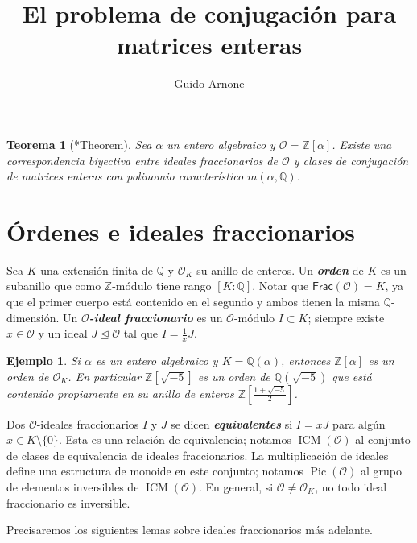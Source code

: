 \documentclass[11pt,a4paper]{amsart}
\title[El problema de conjugación para matrices enteras]{El problema
de conjugación para matrices enteras}
\author{Guido Arnone}
\date{}
\newcommand{\Q}{\mathbb{Q}}
\newcommand{\Z}{\mathbb{Z}}
\renewcommand{\emph}[1]{\textbf{\textit{#1}}}
\DeclareMathOperator{\Pic}{Pic}
\DeclareMathOperator{\ICM}{ICM}
\numberwithin{equation}{section}
\theoremstyle{plain}
\newtheorem{introthm}{Teorema}
\newtheorem{ej}[equation]{Ejemplo}
\renewcommand{\O}{\mathcal{O}}
\begin{document}
\maketitle

\begin{tcolorbox}[colback=thmcol!30, sharp corners, colframe=white]
\begin{introthm}[\cite{lm}*{Theorem}]\label{thm:main} Sea $\alpha$
un entero algebraico y $\mathcal O = \Z[\alpha]$. Existe una correspondencia
biyectiva entre ideales fraccionarios de $\mathcal O$ y clases de
conjugación de matrices enteras con polinomio característico $m(\alpha, \Q)$.
\end{introthm}
\end{tcolorbox}

\section{Órdenes e ideales fraccionarios}

Sea $K$ una extensión finita de $\Q$ y $\O_K$ su anillo de enteros. Un
\emph{orden} de $K$ es un subanillo que como $\Z$-módulo tiene
rango $[K:\Q]$. Notar que $\mathsf{Frac}(\mathcal O) = K$, ya que el primer
cuerpo está contenido en el segundo y ambos tienen la misma
$\Q$-dimensión. Un \emph{$\mathcal O$-ideal fraccionario} es
un $\mathcal O$-módulo $I \subset K$; siempre existe $x \in \mathcal O$
y un ideal $J \trianglelefteq \mathcal O$ tal que $I = \frac{1}{x} J$.
\begin{ej} Si $\alpha$ es un entero algebraico y $K=\Q(\alpha)$,
entonces $\Z[\alpha]$ es un orden de $\O_K$. En particular
$\Z[\sqrt{-5}]$ es un orden de $\Q(\sqrt{-5})$ que está contenido
propiamente en su anillo de enteros $\Z[\frac{1+\sqrt{-5}}{2}]$.
\end{ej}
Dos $\mathcal O$-ideales fraccionarios $I$ y $J$ se dicen \emph{equivalentes}
si $I = xJ$ para algún $x \in K \setminus \{0\}$. Esta es una relación
de equivalencia; notamos $\ICM(\mathcal O)$ al conjunto de clases de
equivalencia de ideales fraccionarios. La multiplicación de ideales define
una estructura de monoide en este conjunto; notamos $\Pic(\O)$
al grupo de elementos inversibles de $\ICM(\O)$. En general,
si $\mathcal O \ne \mathcal O_K$, no todo
ideal fraccionario es inversible.

Precisaremos los siguientes lemas sobre ideales fraccionarios
más adelante.
\end{document}
